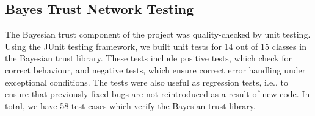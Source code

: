 \subsection{Bayes Trust Network Testing}
The Bayesian trust component of the project was quality-checked by unit testing.
Using the JUnit testing framework, we built unit tests for 14 out of 15 classes
in the Bayesian trust library. These tests include positive tests, which check
for correct behaviour, and negative tests, which ensure correct error handling
under exceptional conditions. The tests were also useful as regression tests,
i.e., to ensure that previously fixed bugs are not reintroduced as a result of
new code. In total, we have 58 test cases which verify the Bayesian trust
library.
